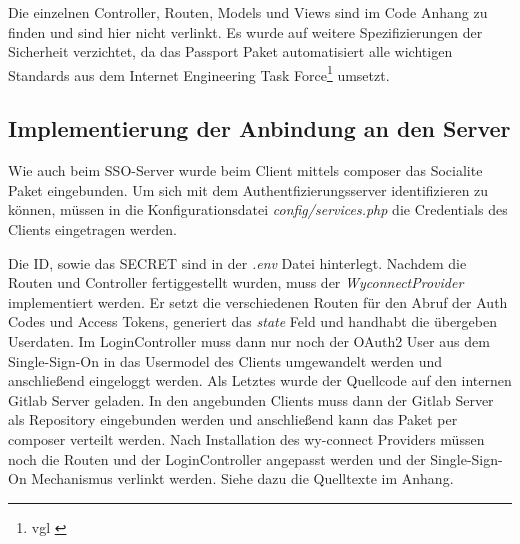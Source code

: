 Die einzelnen Controller, Routen, Models und Views sind im Code Anhang zu finden und sind hier nicht verlinkt. Es wurde auf weitere Spezifizierungen der Sicherheit verzichtet, da das Passport Paket automatisiert alle wichtigen Standards aus dem Internet Engineering Task Force\footnote{vgl \cite{OAuth2}} umsetzt.

\subsection{Implementierung der Anbindung an den Server}
\label{sec:ImplementierungCient}

Wie auch beim SSO-Server wurde beim Client mittels composer das Socialite Paket eingebunden. Um sich mit dem Authentfizierungsserver identifizieren zu können, müssen in die Konfigurationsdatei \textit{config/services.php} die Credentials des Clients eingetragen werden. 

Die ID, sowie das SECRET sind in der \textit{.env} Datei hinterlegt. Nachdem die Routen und Controller fertiggestellt wurden, muss der \textit{WyconnectProvider} implementiert werden. Er setzt die verschiedenen Routen für den Abruf der Auth Codes und Access Tokens, generiert das \textit{state} Feld und handhabt die übergeben Userdaten. 
Im LoginController muss dann nur noch der OAuth2 User aus dem Single-Sign-On in das Usermodel des Clients umgewandelt werden und anschließend eingeloggt werden. 
Als Letztes wurde der Quellcode auf den internen Gitlab Server geladen. In den angebunden Clients muss dann der Gitlab Server als Repository eingebunden werden und anschließend kann das Paket per composer verteilt werden. 
Nach Installation des wy-connect Providers müssen noch die Routen und der LoginController angepasst werden und der Single-Sign-On Mechanismus verlinkt werden. Siehe dazu die Quelltexte im Anhang. 

